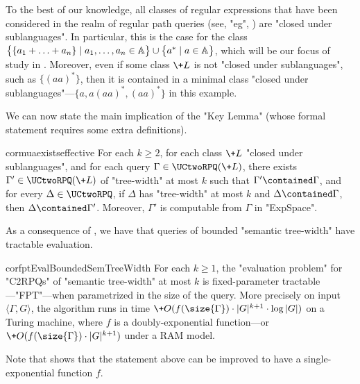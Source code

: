 To the best of our knowledge,
all classes of regular expressions that have been considered in the realm of regular path queries (see, "eg", \cite[\S1]{FigueiraEtal2020Containment}) are "closed under sublanguages". In particular, this is
the case for the class $\bigl\{ \{a_1+\hdots+a_n\} \mid a_1,\hdots,a_n
\in \mathbb{A} \bigr\} \cup \bigl\{ a^* \mid a \in \mathbb{A} \bigr\}$, which will be our focus of study in . Moreover, even if some class $\+L$
is not "closed under sublanguages", such as $\{(aa)^*\}$,
then it is contained in a minimal class "closed under sublanguages"---$\{a, a(aa)^*, (aa)^*\}$ in 
this example.

We can now state the main implication of the "Key Lemma" (whose formal statement requires some extra definitions).
\begin{restatable*}{cor}{muaexistseffective}
    \AP\label{cor:mua-exists-effective}
    For each $k \geq 2$, for each class $\+L$ "closed under sublanguages",
    and for each query $\Gamma \in \UCtwoRPQ(\+L)$,
    there exists $\Gamma' \in \UCtwoRPQ(\+L)$ of "tree-width" at most $k$ 
    such that
    $\Gamma' \contained \Gamma$, and for every $\Delta \in \UCtwoRPQ$, if $\Delta$ has
    "tree-width" at most $k$ and $\Delta \contained \Gamma$, then $\Delta \contained \Gamma'$.
    Moreover, $\Gamma'$ is computable from $\Gamma$ in "ExpSpace".
\end{restatable*}

As a consequence of , we have that queries of bounded "semantic tree-width" have tractable evaluation.
\begin{restatable*}{cor}{fptEvalBoundedSemTreeWidth}
	\AP\label{coro:fpt-eval-bounded-semtreewidth}
	For each $k\geq 1$, the "evaluation problem" for "C2RPQs" of "semantic tree-width"
	at most $k$ is fixed-parameter tractable---"FPT"---when parametrized in the size of
	the query. More precisely on input $\langle \Gamma, G \rangle$,
	the algorithm runs in time
	$\+O(f(\size{\Gamma})\cdot |G|^{k+1} \cdot \log{|G|})$ on a Turing machine, where $f$ is a doubly-exponential function---or $\+O(f(\size{\Gamma})\cdot |G|^{k+1})$ under a RAM model.
\end{restatable*}
Note that \cite[Theorem~22]{FeierGogaczMurlak24Treewidth} shows that the statement above can be improved to have a single-exponential function $f$.

